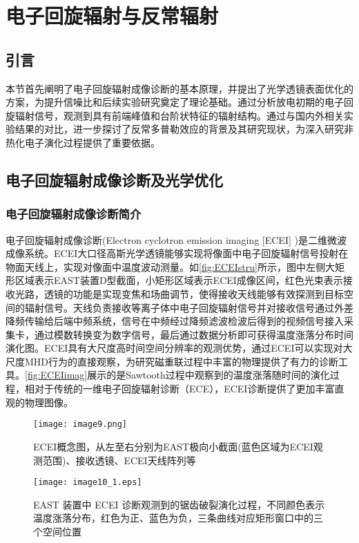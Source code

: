 
\chapter{电子回旋辐射与反常辐射}
\section*{引言}
本节首先阐明了电子回旋辐射成像诊断的基本原理，并提出了光学透镜表面优化的方案，为提升信噪比和后续实验研究奠定了理论基础。通过分析放电初期的电子回旋辐射信号，观测到具有前端峰值和台阶状特征的辐射结构。通过与国内外相关实验结果的对比，进一步探讨了反常多普勒效应的背景及其研究现状，为深入研究非热化电子演化过程提供了重要依据。
\section{电子回旋辐射成像诊断及光学优化}
\subsection{电子回旋辐射成像诊断简介}\label{sec:ECEI}
电子回旋辐射成像诊断\cite{RN1020}(Electron cyclotron emission imaging [ECEI] )是二维微波成像系统。ECEI大口径高斯光学透镜能够实现将像面中电子回旋辐射信号投射在物面天线上，实现对像面中温度波动测量。如\autoref{fig:ECEIstru}所示，图中左侧大矩形区域表示EAST装置D型截面，小矩形区域表示ECEI成像区间，红色光束表示接收光路，透镜的功能是实现变焦和场曲调节，使得接收天线能够有效探测到目标空间的辐射信号。天线负责接收等离子体中电子回旋辐射信号并对接收信号通过外差降频传输给后端中频系统，信号在中频经过降频滤波检波后得到的视频信号接入采集卡，通过模数转换变为数字信号，最后通过数据分析即可获得温度涨落分布时间演化图。ECEI具有大尺度高时间空间分辨率的观测优势，通过ECEI可以实现对大尺度MHD行为的直接观察，为研究磁重联过程中丰富的物理提供了有力的诊断工具。\autoref{fig:ECEIimag}展示的是Sawtooth\cite{RN1791}过程中观察到的温度涨落随时间的演化过程，相对于传统的一维电子回旋辐射诊断（ECE）\cite{RN742}，ECEI诊断提供了更加丰富直观的物理图像。
\begin{figure}[ht]
  \centering
  \texttt{[image: image9.png]}
  \caption{\label{fig:ECEIstru} ECEI概念图\cite{RN1847}，从左至右分别为EAST极向小截面(蓝色区域为ECEI观测范围)、接收透镜、ECEI天线阵列等 }
\end{figure}


\begin{figure}[h]
  \centering
  \texttt{[image: image10\_1.eps]}
  \caption{\label{fig:ECEIimag}EAST 装置中 ECEI 诊断观测到的锯齿破裂演化过程，不同颜色表示温度涨落分布，红色为正、蓝色为负，三条曲线对应矩形窗口中的三个空间位置}
\end{figure}

